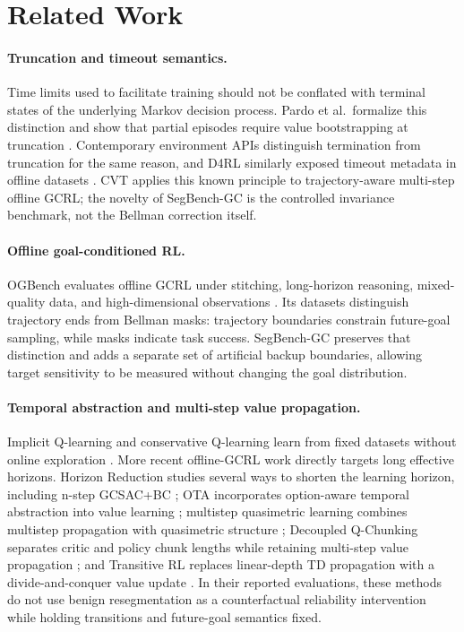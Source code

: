 \section{Related Work}

\paragraph{Truncation and timeout semantics.}
Time limits used to facilitate training should not be conflated with terminal states of the underlying Markov decision process. Pardo et al.\ formalize this distinction and show that partial episodes require value bootstrapping at truncation \cite{pardo2018timelimits}. Contemporary environment APIs distinguish termination from truncation for the same reason, and D4RL similarly exposed timeout metadata in offline datasets \cite{fu2020d4rl}. CVT applies this known principle to trajectory-aware multi-step offline GCRL; the novelty of SegBench-GC is the controlled invariance benchmark, not the Bellman correction itself.

\paragraph{Offline goal-conditioned RL.}
OGBench evaluates offline GCRL under stitching, long-horizon reasoning, mixed-quality data, and high-dimensional observations \cite{ogbench2024}. Its datasets distinguish trajectory ends from Bellman masks: trajectory boundaries constrain future-goal sampling, while masks indicate task success. SegBench-GC preserves that distinction and adds a separate set of artificial backup boundaries, allowing target sensitivity to be measured without changing the goal distribution.

\paragraph{Temporal abstraction and multi-step value propagation.}
Implicit Q-learning and conservative Q-learning learn from fixed datasets without online exploration \cite{kostrikov2022iql,kumar2020cql}. More recent offline-GCRL work directly targets long effective horizons. Horizon Reduction studies several ways to shorten the learning horizon, including n-step GCSAC+BC \cite{park2025horizon}; OTA incorporates option-aware temporal abstraction into value learning \cite{ahn2025ota}; multistep quasimetric learning combines multistep propagation with quasimetric structure \cite{zheng2026mqe}; Decoupled Q-Chunking separates critic and policy chunk lengths while retaining multi-step value propagation \cite{li2026dqc}; and Transitive RL replaces linear-depth TD propagation with a divide-and-conquer value update \cite{park2026trl}. In their reported evaluations, these methods do not use benign resegmentation as a counterfactual reliability intervention while holding transitions and future-goal semantics fixed.

